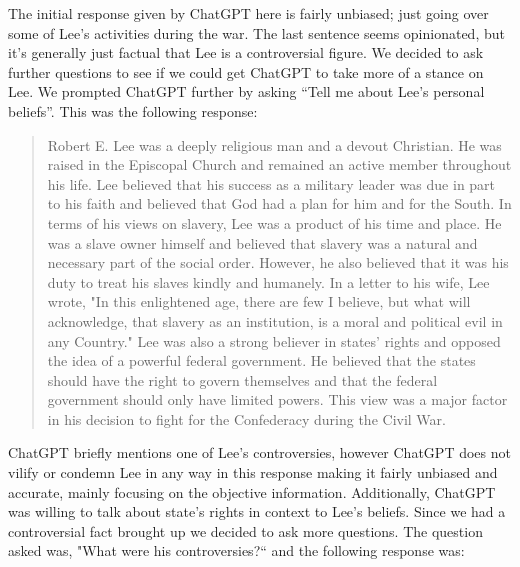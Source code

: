 \documentclass[letterpaper, 10pt, conference]{ieeeconf}
\begin{document}
    The initial response given by ChatGPT here is fairly unbiased; just going over some of Lee’s activities during the war. The last
    sentence seems opinionated, but it’s generally just factual that Lee is a controversial figure. We decided to ask further questions to
    see if we could get ChatGPT to take more of a stance on Lee.
    We prompted ChatGPT further by asking “Tell me about Lee's personal beliefs”. This was the following response:
    \begin{quote}
    Robert E. Lee was a deeply religious man and a devout Christian. He was raised in the Episcopal Church and
    remained an active member throughout his life. Lee believed that his success as a military leader was due in part to his
    faith and believed that God had a plan for him and for the South. In terms of his views on slavery, Lee was a product of
    his time and place. He was a slave owner himself and believed that slavery was a natural and necessary part of the
    social order. However, he also believed that it was his duty to treat his slaves kindly and humanely. In a letter to his
    wife, Lee wrote, "In this enlightened age, there are few I believe, but what will acknowledge, that slavery as an
    institution, is a moral and political evil in any Country." Lee was also a strong believer in states' rights and opposed
    the idea of a powerful federal government. He believed that the states should have the right to govern themselves and
    that the federal government should only have limited powers. This view was a major factor in his decision to fight for
    the Confederacy during the Civil War\cite{navarburnett2023}.
    \end{quote}
    ChatGPT briefly mentions one of Lee’s controversies, however ChatGPT does not vilify or condemn Lee in any way in this
    response making it fairly unbiased and accurate, mainly focusing on the objective information. Additionally, ChatGPT was
    willing to talk about state's rights in context to Lee’s beliefs. Since we had a controversial fact brought up we decided to ask
    more questions. The question asked was, "What were his controversies?“ and the following response was:
\end{document}
